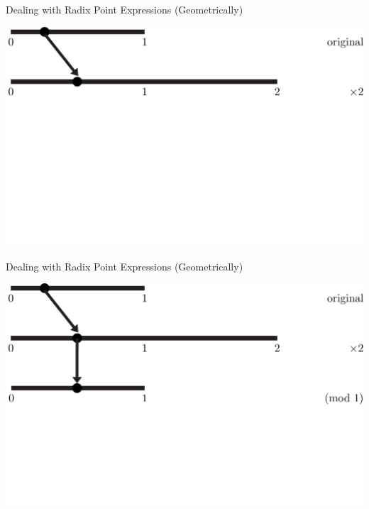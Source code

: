 \documentclass{beamer}
\begin{document}
\begin{frame}{Dealing with Radix Point Expressions (Geometrically)}
  \addtocounter{framenumber}{-1}
  \begin{example}
    \includegraphics[width=\textwidth,height=0.75\textheight]{images/Binary/2}
  \end{example}
\end{frame}

\begin{frame}{Dealing with Radix Point Expressions (Geometrically)}
  \addtocounter{framenumber}{-1}
  \begin{example}
    \includegraphics[width=\textwidth,height=0.75\textheight]{images/Binary/3}
  \end{example}
\end{frame}
\end{document}
